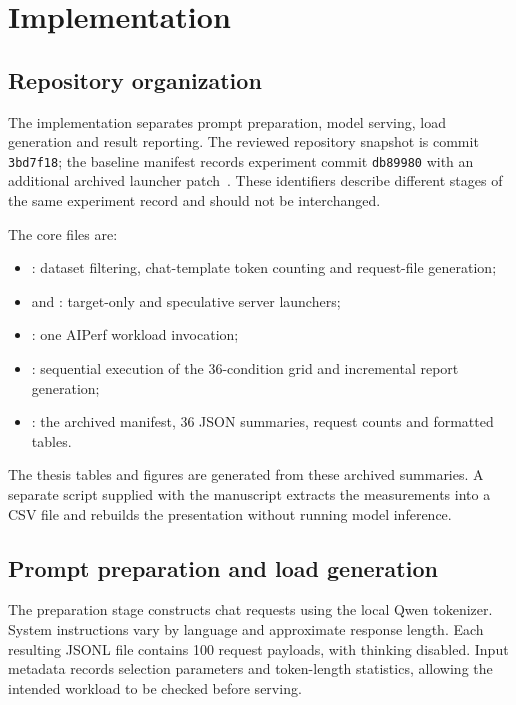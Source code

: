 \chapter{Implementation}
\label{chap:impl}

\section{Repository organization}
The implementation separates prompt preparation, model serving, load generation and result reporting. The reviewed repository snapshot is commit \texttt{3bd7f18}; the baseline manifest records experiment commit \texttt{db89980} with an additional archived launcher patch~\cite{repo,baseline}. These identifiers describe different stages of the same experiment record and should not be interchanged.

The core files are:
\begin{itemize}[noitemsep]
\item {}: dataset filtering, chat-template token counting and request-file generation;
\item {} and : target-only and speculative server launchers;
\item {}: one AIPerf workload invocation;
\item {}: sequential execution of the 36-condition grid and incremental report generation;
\item {}: the archived manifest, 36 JSON summaries, request counts and formatted tables.
\end{itemize}
The thesis tables and figures are generated from these archived summaries. A separate script supplied with the manuscript extracts the measurements into a CSV file and rebuilds the presentation without running model inference.

\section{Prompt preparation and load generation}
The preparation stage constructs chat requests using the local Qwen tokenizer. System instructions vary by language and approximate response length. Each resulting JSONL file contains 100 request payloads, with thinking disabled. Input metadata records selection parameters and token-length statistics, allowing the intended workload to be checked before serving.

